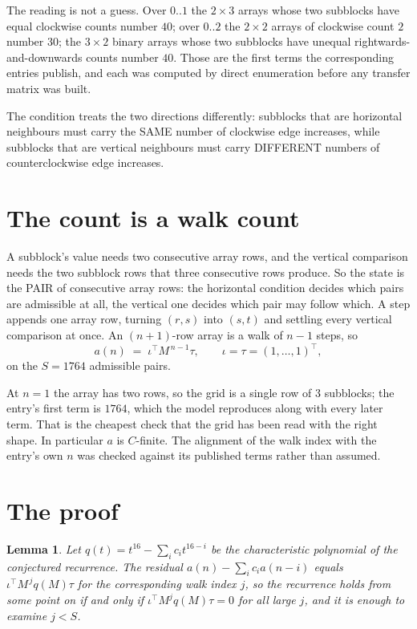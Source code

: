 \documentclass[11pt,a4paper]{article}
\theoremstyle{plain}
\newtheorem{lemma}[theorem]{Lemma}
\theoremstyle{definition}
\begin{document}
The reading is not a guess. Over $0..1$ the $2\times3$ arrays whose two subblocks have equal
clockwise counts number $40$; over $0..2$ the $2\times2$ arrays of clockwise count $2$ number
$30$; the $3\times2$ binary arrays whose two subblocks have unequal rightwards-and-downwards
counts number $40$. Those are the first terms the corresponding entries publish, and each was
computed by direct enumeration before any transfer matrix was built.

The condition treats the two directions differently: subblocks that are horizontal neighbours
must carry the SAME number of clockwise edge increases, while subblocks that are vertical neighbours must carry
DIFFERENT numbers of counterclockwise edge increases.

\section{The count is a walk count}

A subblock's value needs two consecutive array rows, and the vertical
comparison needs the two subblock rows that three consecutive rows produce. So the state is the
PAIR of consecutive array rows: the horizontal condition decides which pairs are admissible at
all, the vertical one decides which pair may follow which. A step appends one array row,
turning $(r,s)$ into $(s,t)$ and settling every vertical comparison at once. An $(n+1)$-row
array is a walk of $n-1$ steps, so
\[
a(n)\;=\;\iota^{\!\top}M^{\,n-1}\tau,\qquad\iota=\tau=(1,\dots,1)^{\!\top},
\]
on the $S=1764$ admissible pairs.

At $n=1$ the array has two rows, so the grid is a single row of $3$
subblocks; the entry's first term is $1764$, which the model
reproduces along with every later term. That is the cheapest check that the grid has been read
with the right shape.
In particular $a$ is $C$-finite. The alignment of the walk index with the entry's own $n$ was
checked against its published terms rather than assumed.

\section{The proof}

\begin{lemma}\label{lem:crit}
Let $q(t)=t^{16}-\sum_i c_it^{16-i}$ be the characteristic polynomial of the
conjectured recurrence. The residual $a(n)-\sum_ic_ia(n-i)$ equals
$\iota^{\!\top}M^{\,j}q(M)\tau$ for the corresponding walk index $j$, so the recurrence
holds from some point on if and only if $\iota^{\!\top}M^{j}q(M)\tau=0$ for all large $j$,
and it is enough to examine $j<S$.
\end{lemma}
\end{document}

